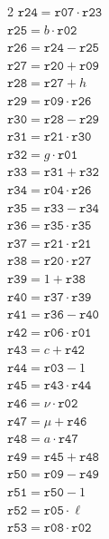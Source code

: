 \documentclass[10pt]{article}
\begin{document}
\begin{multicols}{2}
\(\mathtt{r24} = \mathtt{r07} \cdot \mathtt{r23}\)\\
\(\mathtt{r25} = b \cdot \mathtt{r02}\)\\
\(\mathtt{r26} = \mathtt{r24} - \mathtt{r25}\)\\
\(\mathtt{r27} = \mathtt{r20} + \mathtt{r09}\)\\
\(\mathtt{r28} = \mathtt{r27} + h\)\\
\(\mathtt{r29} = \mathtt{r09} \cdot \mathtt{r26}\)\\
\(\mathtt{r30} = \mathtt{r28} - \mathtt{r29}\)\\
\(\mathtt{r31} = \mathtt{r21} \cdot \mathtt{r30}\)\\
\(\mathtt{r32} = g \cdot \mathtt{r01}\)\\
\(\mathtt{r33} = \mathtt{r31} + \mathtt{r32}\)\\
\(\mathtt{r34} = \mathtt{r04} \cdot \mathtt{r26}\)\\
\(\mathtt{r35} = \mathtt{r33} - \mathtt{r34}\)\\
\(\mathtt{r36} = \mathtt{r35} \cdot \mathtt{r35}\)\\
\(\mathtt{r37} = \mathtt{r21} \cdot \mathtt{r21}\)\\
\(\mathtt{r38} = \mathtt{r20} \cdot \mathtt{r27}\)\\
\(\mathtt{r39} = 1 + \mathtt{r38}\)\\
\(\mathtt{r40} = \mathtt{r37} \cdot \mathtt{r39}\)\\
\(\mathtt{r41} = \mathtt{r36} - \mathtt{r40}\)\\
\(\mathtt{r42} = \mathtt{r06} \cdot \mathtt{r01}\)\\
\(\mathtt{r43} = c + \mathtt{r42}\)\\
\(\mathtt{r44} = \mathtt{r03} - 1\)\\
\(\mathtt{r45} = \mathtt{r43} \cdot \mathtt{r44}\)\\
\(\mathtt{r46} = \nu \cdot \mathtt{r02}\)\\
\(\mathtt{r47} = \mu + \mathtt{r46}\)\\
\columnbreak
\(\mathtt{r48} = a \cdot \mathtt{r47}\)\\
\(\mathtt{r49} = \mathtt{r45} + \mathtt{r48}\)\\
\(\mathtt{r50} = \mathtt{r09} - \mathtt{r49}\)\\
\(\mathtt{r51} = \mathtt{r50} - 1\)\\
\(\mathtt{r52} = \mathtt{r05} \cdot \ell\)\\
\(\mathtt{r53} = \mathtt{r08} \cdot \mathtt{r02}\)\\

\end{multicols}
\end{document}
